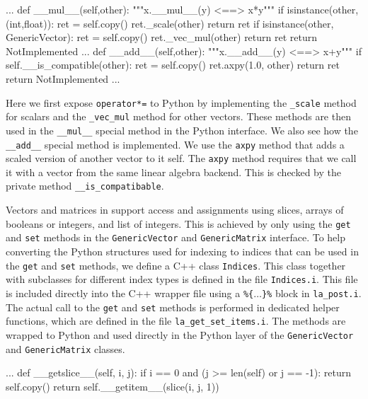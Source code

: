 \begin{code}
\begin{code}
   ...
    def __mul__(self,other):
        """x.__mul__(y) <==> x*y"""
        if isinstance(other,(int,float)):
            ret = self.copy()
            ret._scale(other)
            return ret
        if isinstance(other, GenericVector):
            ret = self.copy()
            ret._vec_mul(other)
            return ret
        return NotImplemented
    ...
    def __add__(self,other):
        """x.__add__(y) <==> x+y"""
        if self.__is_compatible(other):
            ret = self.copy()
            ret.axpy(1.0, other)
            return ret
        return NotImplemented
   ...
\end{code}
Here we first expose \texttt{operator*=} to Python by implementing the \texttt{\_scale} method for scalars and the \texttt{\_vec\_mul} method for other vectors. These methods are then used in the \texttt{\_\_mul\_\_} special method in the Python interface. We also see how the \texttt{\_\_add\_\_} special method is implemented. We use the \texttt{axpy} method that adds a scaled version of another vector to it self. The \texttt{axpy} method requires that we call it with a vector from the same linear algebra backend. This is checked by the private method \texttt{\_\_is\_compatibable}.\par

Vectors and matrices in \pydolfin support access and assignments using slices, \numpy arrays of booleans or integers, and list of integers. This is achieved by only using the \texttt{get} and \texttt{set} methods in the \texttt{GenericVector} and \texttt{GenericMatrix} interface. To help converting the Python structures used for indexing to indices that can be used in the \texttt{get} and \texttt{set} methods, we define a C++ class \texttt{Indices}. This class together with subclasses for different index types is defined in the file \texttt{Indices.i}. This file is included directly into the C++ wrapper file using a \texttt{\%\{$\ldots$\}\%} block in \texttt{la\_post.i}. The actual call to the \texttt{get} and \texttt{set} methods is performed in dedicated helper functions, which are defined in the file \texttt{la\_get}\texttt{\_set\_items.i}. The methods are wrapped to Python and used directly in the Python layer of the \texttt{GenericVector} and \texttt{GenericMatrix} classes.
\begin{code}
   ...
    def __getslice__(self, i, j):
        if i == 0 and (j >= len(self) or j == -1):
            return self.copy()
        return self.__getitem__(slice(i, j, 1))
    

\end{code}
\end{code}
